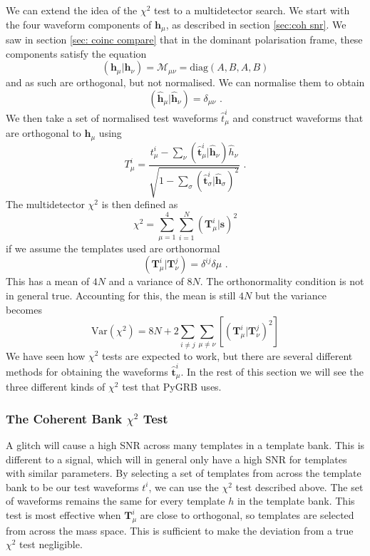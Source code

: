 \documentclass[11pt]{cuthesis}
\newcommand{\mn}{_{\mu\nu}}
\newcommand{\fs}{\text{ .}}
\begin{document}
We can extend the idea of the $\chi^2$ test to a multidetector search. We start with the four waveform components of $\textbf{h}_\mu$, as described in section \ref{sec:coh snr}. We saw in section \ref{sec: coinc compare} that in the dominant polarisation frame, these components satisfy the equation
\begin{equation}
( \textbf{h}_\mu | \textbf{h}_\nu ) = \mathcal{M}\mn = \text{diag}(A,B,A,B)
\end{equation}
and as such are orthogonal, but not normalised. We can normalise them to obtain 
\begin{equation}
(\hat{\textbf{h}}_\mu |\hat{\textbf{h}}_\nu ) = \delta\mn \fs
\end{equation}
We then take a set of normalised test waveforms $\hat{t}^i_\mu$ and construct waveforms that are orthogonal to $\hat{\textbf{h}}_\mu$ using
\begin{equation}
T^i_\mu = \frac{t^i_\mu - \sum_\nu(\hat{\textbf{t}}^i_\mu | \hat{\textbf{h}}_\nu)\hat{h}_\nu}{\sqrt{1-\sum_\sigma(\hat{\textbf{t}}^i_\sigma|\hat{\textbf{h}}_\sigma)^2}} \fs
\end{equation}
The multidetector $\chi^2$ is then defined as
\begin{equation} \label{coh chisq}
\chi^2 = \sum_{\mu=1}^4 \sum_{i=1}^N (\textbf{T}^i_\mu | \textbf{s})^2 
\end{equation}
if we assume the templates used are orthonormal
\begin{equation}
( \textbf{T}^i_\mu | \textbf{T}^j_\nu ) = \delta^{ij}\delta\mu \fs
\end{equation}
This has a mean of $4N$ and a variance of $8N$. The orthonormality condition is not in general true. Accounting for this, the mean is still $4N$ but the variance becomes
\begin{equation} \label{coh chisq var}
\text{Var}(\chi^2) = 8N + 2\sum_{i \neq j} \sum_{\mu\neq\nu} [(\textbf{T}^i_\mu | \textbf{T}^j_\nu)^2 ] 
\end{equation}
We have seen how $\chi^2$ tests are expected to work, but there are several different methods for obtaining the waveforms $\hat{\textbf{t}}^i_\mu$. In the rest of this section we will see the three different kinds of $\chi^2$ test that PyGRB uses.


\subsubsection{The Coherent Bank $\chi^2$ Test}
A glitch will cause a high SNR across many templates in a template bank. This is different to a signal, which will in general only have a high SNR for templates with similar parameters. By selecting a set of templates from across the template bank to be our test waveforms $t^i$, we can use the $\chi^2$ test described above. The set of waveforms remains the same for every template $h$ in the template bank. This test is most effective when $\textbf{T}^i_\mu$ are close to orthogonal, so templates are selected from across the mass space. This is sufficient to make the deviation from a true $\chi^2$ test negligible. 
\end{document}
